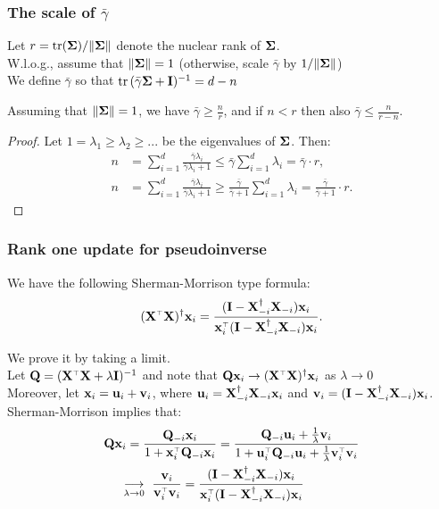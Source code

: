 \documentclass[10pt]{beamer}
\begin{document}
  \begin{frame}
    \frametitle{The scale of $\bar\gamma$}
    Let $r = \mathrm{tr}(\mathbf{\Sigma})/\|\mathbf{\Sigma}\|$ denote the nuclear rank of $\mathbf{\Sigma}$.\\
    W.l.o.g., assume that $\|\mathbf{\Sigma}\|=1$ (otherwise, scale $\bar\gamma$ by
    $1/\|\mathbf{\Sigma}\|$)\\
    We define $\bar\gamma$ so that $\mathrm{tr}\,(\bar\gamma\mathbf{\Sigma}+\mathbf I)^{-1}=d-n$
    \begin{lemma}
      Assuming that $\|\mathbf{\Sigma}\|=1$, we have $\bar\gamma\geq \frac nr$, and if $n<r$ then also
      $\bar\gamma\leq \frac n{r-n}$.
      \end{lemma}
      \begin{proof}
        Let $1=\lambda_1\geq\lambda_2\geq...$ be the eigenvalues of
        $\mathbf{\Sigma}$. Then:
        \begin{align*}
          n &= \sum_{i=1}^d
          \frac{\bar\gamma\lambda_i}{\bar\gamma\lambda_i+1}\leq
          \bar\gamma\sum_{i=1}^d\lambda_i=\bar\gamma\cdot r,\\
          n &= \sum_{i=1}^d
          \frac{\bar\gamma\lambda_i}{\bar\gamma\lambda_i+1}\geq
              \frac{\bar\gamma}{\bar\gamma+1}\sum_{i=1}^d\lambda_i
              =\frac{\bar\gamma}{\bar\gamma+1}\cdot r.
        \end{align*}
      \end{proof}
  \end{frame}

  \begin{frame}
    \frametitle{Rank one update for pseudoinverse}
    \begin{lemma}
      We have the following Sherman-Morrison type formula:
      \begin{align*}
        (\X^\top\X)^\dagger\x_i =
        \frac{(\I-\X_{-i}^\dagger\X_{-i})\x_i}{\x_i^\top(\I-\X_{-i}^\dagger\X_{-i})\x_i}. 
        \end{align*}
      \end{lemma}
      We prove it by taking a limit.\\
    Let $\Q = (\X^\top\X+\lambda\I)^{-1}$ and note that
    $\Q\x_i\rightarrow (\X^\top\X)^\dagger\x_i$ as
    $\lambda\rightarrow 0$\\
Moreover, let $\mathbf x_i=\mathbf u_i+\mathbf v_i$, where
$\mathbf u_i=\mathbf X_{-i}^\dagger\mathbf X_{-i}\mathbf x_i$ and $\mathbf v_i=(\mathbf I-\mathbf X_{-i}^\dagger\mathbf X_{-i})\mathbf x_i$.
    Sherman-Morrison implies that:
  \begin{align*}
    \Q\x_i
    &=\frac{\Q_{-i}\x_i}{1+\x_i^\top\Q_{-i}\x_i} 
    =\frac{\Q_{-i}\u_i + \frac1\lambda\v_i}{1+
      \u_i^\top\Q_{-i}\u_i + \frac1\lambda\v_i^\top\v_i}\\
    &\!\!\!\underset{\lambda\rightarrow0}{\longrightarrow}
      \ \frac{\v_i}{\v_i^\top\v_i}
      =\frac{(\I-\X_{-i}^\dagger\X_{-i})\x_i}{\x_i^\top(\I-\X_{-i}^\dagger\X_{-i})\x_i}
  \end{align*}
\end{frame}
\end{document}
